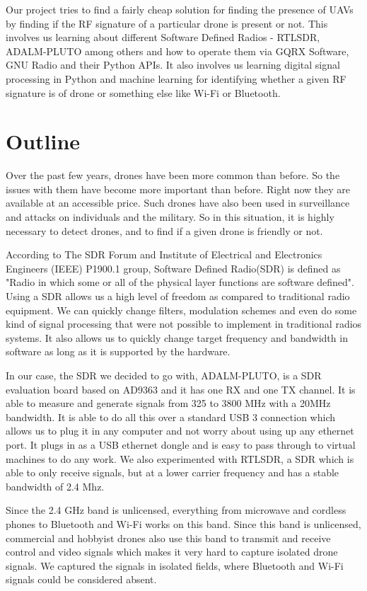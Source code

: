 \noindent Our project tries to find a fairly cheap solution for finding the presence of UAVs by finding if the RF signature of a particular drone is present or not. This involves us learning about different Software Defined Radios - RTLSDR, ADALM-PLUTO among others and how to operate them via GQRX Software, GNU Radio and their Python APIs. It also involves us learning digital signal processing in Python and machine learning for identifying whether a given RF signature is of drone or something else like Wi-Fi or Bluetooth.


\section{Outline} \label{Outline}

\noindent Over the past few years, drones have been more common than before. So the issues with them have become more important than before. Right now they are available at an accessible price. Such drones have also been used in surveillance and attacks on individuals and the military. So in this situation, it is highly necessary to detect drones, and to find if a given drone is friendly or not.

\noindent According to The SDR Forum and Institute of Electrical and Electronics Engineers (IEEE) P1900.1 group, Software Defined Radio(SDR) is defined as "Radio in which some or all of the physical layer functions are software defined". Using a SDR allows us a high level of freedom as compared to traditional radio equipment. We can quickly change filters, modulation schemes and even do some kind of signal processing that were not possible to implement in traditional radios  systems. It also allows us to quickly change target frequency and bandwidth in software as long as it is supported by the hardware.

\noindent In our case, the SDR we decided to go with, ADALM-PLUTO, is a SDR evaluation board based on AD9363 and it has one RX and one TX channel.  It is able to measure and generate signals from 325 to 3800 MHz with a 20MHz bandwidth. It is able to do all this over a standard USB 3 connection which allows us to plug it in any computer and not worry about using up any ethernet port. It plugs in as a USB ethernet dongle and is easy to pass through to virtual machines to do any work. We also experimented with RTLSDR, a SDR which is able to only receive signals, but at a lower carrier frequency and has a stable bandwidth of 2.4 Mhz.

\noindent Since the 2.4 GHz band is unlicensed, everything from microwave and cordless phones to Bluetooth and Wi-Fi works on this band. Since this band is unlicensed, commercial and hobbyist drones also use this band to transmit and receive control and video signals which makes it very hard to capture isolated drone signals. We captured the signals in isolated fields, where Bluetooth and Wi-Fi signals could be considered absent.


